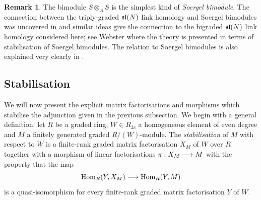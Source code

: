 \documentclass{compositio}
\theoremstyle{definition}
\newtheorem{remark}[theorem]{Remark}
\numberwithin{equation}{section}
\def\Hom{\operatorname{Hom}}
\begin{document}
\begin{remark} The bimodule $S \otimes_A S$ is the simplest kind of \emph{Soergel bimodule}. The connection between the triply-graded $\mathfrak{sl}(N)$ link homology and Soergel bimodules was uncovered in \cite{k0510265} and similar ideas give the connection to the bigraded $\mathfrak{sl}(N)$ link homology considered here; see Webster \cite[Section 2.3]{w0610650} where the theory is presented in terms of stabilisation of Soergel bimodules. The relation to Soergel bimodules is also explained very clearly in \cite{b1105.0702}.
\end{remark}


\subsection{Stabilisation}\label{section:stabilisation}

We will now present the explicit matrix factorisations and morphisms which stabilise the adjunction given in the previous subsection. We begin with a general definition: let $R$ be a graded ring, $W \in R_{2c}$ a homogeneous element of even degree and $M$ a finitely generated graded $R/(W)$-module. The \emph{stabilisation} of $M$ with respect to $W$ is a finite-rank graded matrix factorisation $X_M$ of $W$ over $R$ together with a morphism of linear factorisations $\pi: X_M \longrightarrow M$ with the property that the map
\[
\Hom_R(Y, X_M) \lto \Hom_R(Y, M)
\]
is a quasi-isomorphism for every finite-rank graded matrix factorisation $Y$ of $W$.
\end{document}
